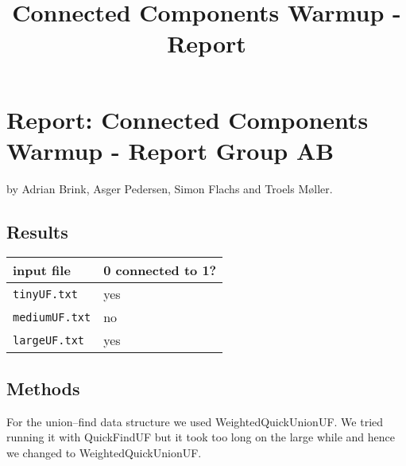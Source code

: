 \documentclass{scrartcl}
\title{Connected Components Warmup - Report}
\begin{document}
\maketitle

\section{Report: Connected Components Warmup - Report Group AB}


by Adrian Brink, Asger Pedersen, Simon Flachs and Troels Møller.


\subsection{Results}

\begin{tabular}{ll}
  \toprule
  input file & 0 connected to 1? \\
  \midrule
  {\tt tinyUF.txt} & yes \\
  {\tt mediumUF.txt} & no \\
  {\tt largeUF.txt} & yes \\
  \bottomrule
\end{tabular}

\subsection{Methods}

For the union--find data structure we used WeightedQuickUnionUF.
We tried running it with QuickFindUF but it took too long on the large while and hence we changed to WeightedQuickUnionUF.
\end{document}
